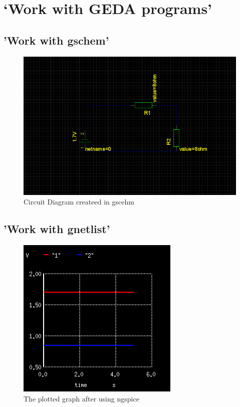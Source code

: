 \documentclass{report}
\begin{document}
\section{‘Work with GEDA programs'}
\subsection{'Work with gschem'}
\begin{figure}[hbt!]
\centering
\caption{Circuit Diagram createed in gscehm}
\includegraphics[width=\textwidth]{01.png}
\end{figure}
\subsection{'Work with gnetlist'}

\begin{figure}[hbt!]
\centering
\caption{The plotted graph after using ngspice}
\includegraphics[width=\textwidth]{02.png}
\end{figure}
\end{document}

